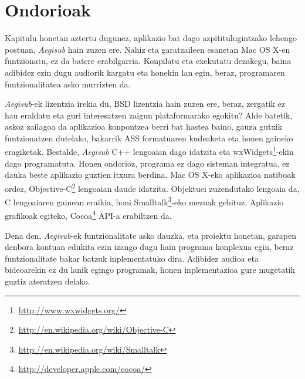 \section{Ondorioak}

Kapitulu honetan aztertu dugunez, aplikazio bat dago azpititulugintzako lehengo postuan, \textit{Aegisub} hain zuzen ere. Nahiz eta garatzaileen esanetan Mac OS X-en funtzionatu, ez da batere erabilgarria. Konpilatu eta exekutatu dezakegu, baina adibidez ezin dugu audiorik kargatu eta honekin lan egin, beraz, programaren funtzionalitatea asko murrizten da.

\textit{Aegisub}-ek lizentzia irekia du, BSD lizentzia hain zuzen ere, beraz, zergatik ez hau eraldatu eta guri interesatzen zaigun plataformarako egokitu? Alde batetik, askoz zailagoa da aplikazioa konpontzea berri bat hastea baino, gauza gutxik funtzionatzen dutelako, bakarrik ASS formatuaren kudeaketa eta honen gaineko eragiketak. Bestalde, \textit{Aegisub} C++ lengoaian dago idatzita eta wxWidgets\footnote{\url{http://www.wxwidgets.org/}}-ekin dago programatuta. Honen ondorioz, programa ez dago sisteman integratua, ez dauka beste aplikazio guztien itxura berdina.
Mac OS X-eko aplikazioa natiboak ordez, Objective-C\footnote{\url{http://en.wikipedia.org/wiki/Objective-C}} lengoaian daude idatzita. Objektuei zuzendutako lengoaia da, C lengoaiaren gainean eraikia, honi Smalltalk\footnote{\url{http://en.wikipedia.org/wiki/Smalltalk}}-eko mezuak gehituz. Aplikazio grafikoak egiteko, Cocoa\footnote{\url{http://developer.apple.com/cocoa/}} API-a erabiltzen da.

Dena den, \textit{Aegisub}-ek funtzionalitate asko dauzka, eta proiektu honetan, garapen denbora kontuan edukita ezin izango dugu hain programa konplexua egin, beraz funtzionalitate bakar batzuk inplementatuko dira. Adibidez audioa eta bideoarekin ez du lanik egingo programak, honen inplementazioa gure mugetatik guztiz ateratzen delako.
